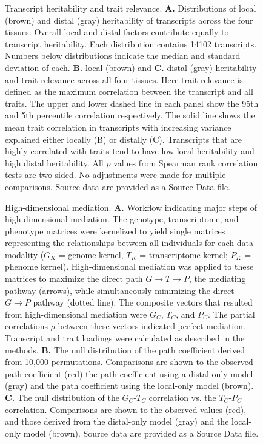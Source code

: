 \documentclass[
]{article}
\begin{document}
\begin{figure}[ht!]
\caption{Transcript heritability and trait relevance. 
\textbf{A.} Distributions of local (brown) and distal (gray) 
heritability of transcripts across the four tissues. Overall 
local and distal factors contribute equally to transcript 
heritability. Each distribution contains 14102 transcripts. 
Numbers below distributions indicate the median and 
standard deviation of each. \textbf{B.} local (brown) and 
\textbf{C.} distal (gray) heritability and trait relevance across 
all four tissues. Here trait relevance is defined as the maximum 
correlation between the transcript and all traits. The upper 
and lower dashed line in each panel show the 95th and 5th 
percentile correlation respectively. The solid line shows the 
mean trait correlation in transcripts with increasing variance 
explained either locally (B) or distally (C). Transcripts that are 
highly correlated with traits tend to have low local heritability 
and high distal heritability. All $p$ values from Spearman rank
correlation tests are two-sided. No adjustments were made 
for multiple comparisons. Source data are provided as a Source 
Data file.
}
\label{fig:motivation}
\end{figure}

\begin{figure}[ht!]
\caption{High-dimensional mediation. \textbf{A.} Workflow 
indicating major steps of high-dimensional mediation. The 
genotype, transcriptome, and phenotype matrices were 
kernelized to yield single matrices representing the 
relationships between all individuals for each data modality 
($G_K$ = genome kernel, $T_K$ = transcriptome kernel; 
$P_K$ = phenome kernel). High-dimensional mediation 
was applied to these matrices to maximize the direct path 
$G \rightarrow T \rightarrow P$, the mediating pathway 
(arrows), while simultaneously minimizing the direct $G 
\rightarrow P$ pathway (dotted line). The composite 
vectors that resulted from high-dimensional mediation 
were $G_C$, $T_C$, and $P_C$. The partial correlations 
$\rho$ between these vectors indicated perfect mediation. 
Transcript and trait loadings were calculated as described 
in the methods. \textbf{B.} The null distribution of the path 
coefficient derived from 10,000 permutations. Comparisons 
are shown to the observed path coefficient (red) the path 
coefficient using a distal-only model (gray) and the path 
coefficient using the local-only model (brown). \textbf{C.} 
The null distribution of the $G_C$-$T_C$ correlation vs. 
the $T_C$-$P_C$ correlation. Comparisons are shown 
to the observed values (red), and those derived from the 
distal-only model (gray) and the local-only model (brown).
Source data are provided as a Source Data file.
}
\label{fig:workflow}
\end{figure}
\end{document}

